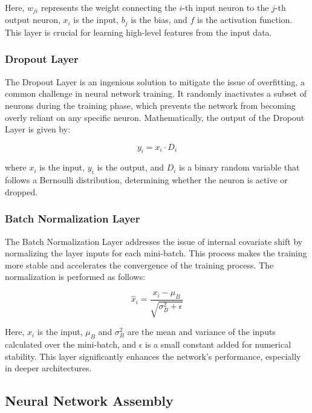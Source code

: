 \documentclass{article}
\begin{document}
Here, \( w_{ji} \) represents the weight connecting the \( i \)-th input neuron to the \( j \)-th output neuron, \( x_i \) is the input, \( b_j \) is the bias, and \( f \) is the activation function. This layer is crucial for learning high-level features from the input data.

\subsubsection{Dropout Layer}

The Dropout Layer is an ingenious solution to mitigate the issue of overfitting, a common challenge in neural network training. It randomly inactivates a subset of neurons during the training phase, which prevents the network from becoming overly reliant on any specific neuron. Mathematically, the output of the Dropout Layer is given by:

\begin{equation}
    y_i = x_i \cdot D_i
\end{equation}

where \( x_i \) is the input, \( y_i \) is the output, and \( D_i \) is a binary random variable that follows a Bernoulli distribution, determining whether the neuron is active or dropped.

\subsubsection{Batch Normalization Layer}

The Batch Normalization Layer addresses the issue of internal covariate shift by normalizing the layer inputs for each mini-batch. This process makes the training more stable and accelerates the convergence of the training process. The normalization is performed as follows:

\begin{equation}
    \hat{x}_i = \frac{x_i - \mu_B}{\sqrt{\sigma_B^2 + \epsilon}}
\end{equation}

Here, \( x_i \) is the input, \( \mu_B \) and \( \sigma_B^2 \) are the mean and variance of the inputs calculated over the mini-batch, and \( \epsilon \) is a small constant added for numerical stability. This layer significantly enhances the network's performance, especially in deeper architectures.

\subsection{Neural Network Assembly}
\end{document}
